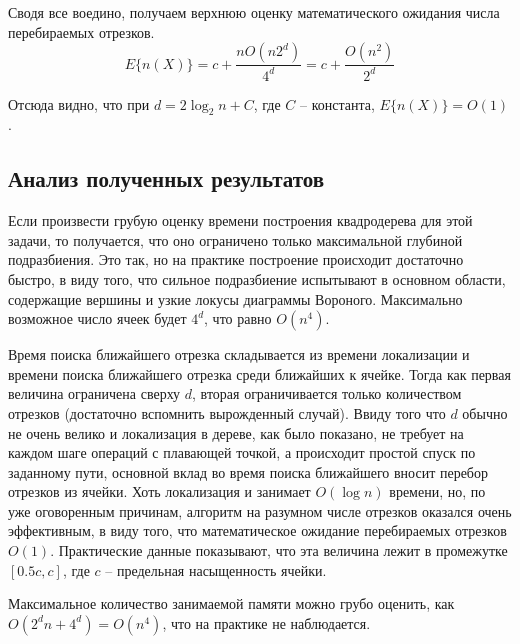 Сводя все воедино, получаем верхнюю оценку математического ожидания числа перебираемых отрезков.
\begin{equation}
E\{n(X)\} = c + \frac{nO(n2^d)}{4^d} = c + \frac{O(n^2)}{2^d}
\end{equation}

Отсюда видно, что при $d = 2\log_2 n + C$, где $C$ -- константа, $E\{n(X)\} = O(1)$.

\FloatBarrier
\subsection{Анализ полученных результатов}
Если произвести грубую оценку времени построения квадродерева для
этой задачи, то получается, что оно ограничено только максимальной глубиной
подразбиения. Это так, но на практике построение происходит достаточно
быстро, в виду того, что сильное подразбиение испытывают в основном
области, содержащие вершины и узкие локусы диаграммы Вороного. 
Максимально возможное число ячеек будет $4^d$, что равно $O(n^4)$.

Время поиска ближайшего отрезка складывается из времени
локализации и времени поиска ближайшего отрезка среди ближайших к
ячейке. Тогда как первая величина ограничена сверху $d$, вторая ограничивается
только количеством отрезков (достаточно вспомнить вырожденный случай).
Ввиду того что $d$ обычно не очень велико и локализация в дереве, как
было показано, не требует на каждом шаге операций с плавающей точкой, 
а происходит простой спуск по заданному пути, основной вклад во время 
поиска ближайшего вносит перебор отрезков из ячейки.
Хоть локализация и занимает $O(\log n)$ времени, но, по уже оговоренным причинам,
алгоритм на разумном числе отрезков оказался очень эффективным, в виду того,
что математическое ожидание перебираемых отрезков $O(1)$. Практические данные
показывают, что эта величина лежит в промежутке $[0.5c, c]$, где $c$ -- предельная
насыщенность ячейки.

Максимальное количество занимаемой памяти можно грубо оценить, как
$O(2^d n + 4^d) = O(n^4)$, что на практике не наблюдается.

\FloatBarrier
